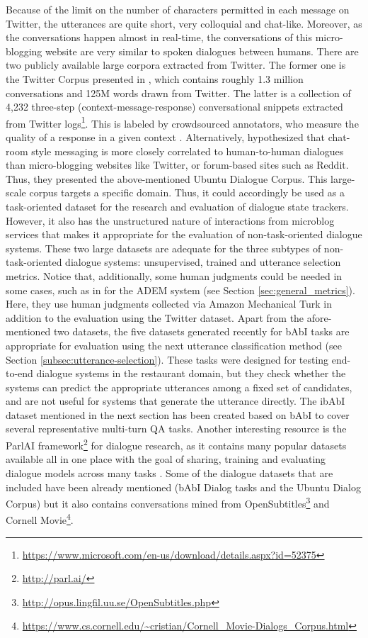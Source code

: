 Because of the limit on the number of characters permitted in each message on Twitter, the utterances are quite short, very colloquial and chat-like. Moreover, as the conversations happen almost in real-time, the conversations of this micro-blogging website are very similar to spoken dialogues between humans. There are two publicly available large corpora extracted from Twitter. The former one is the Twitter Corpus presented in , which contains roughly 1.3 million conversations and 125M words drawn from Twitter. The latter is a collection of 4,232 three-step (context-message-response) conversational snippets extracted from Twitter logs\footnote{\url{https://www.microsoft.com/en-us/download/details.aspx?id=52375}}. This is labeled by crowdsourced annotators, who measure the quality of a response in a given context .
Alternatively,  hypothesized that chat-room style messaging is more closely correlated to human-to-human dialogues than micro-blogging websites like Twitter, or forum-based sites such as Reddit. Thus, they presented the above-mentioned Ubuntu Dialogue Corpus. This large-scale corpus targets a specific domain. Thus, it could accordingly be used as a task-oriented dataset for the research and evaluation of dialogue state trackers. However, it also has the unstructured nature of interactions from microblog services that makes it appropriate for the evaluation of non-task-oriented dialogue systems. 
These two large datasets are adequate for the three subtypes of non-task-oriented dialogue systems: unsupervised, trained and utterance selection metrics. Notice that, additionally, some human judgments could be needed in some cases, such as in  for the ADEM system (see Section \ref{sec:general_metrics}). Here, they use human judgments collected via Amazon Mechanical Turk in addition to the evaluation using the Twitter dataset. 
Apart from the afore-mentioned two datasets, the five datasets generated recently for bAbI tasks  are appropriate for evaluation using the next utterance classification method (see Section \ref{subsec:utterance-selection}). These tasks were designed for testing end-to-end dialogue systems in the restaurant domain, but they check whether the systems can predict the appropriate utterances among a fixed set of candidates, and are not useful for systems that generate the utterance directly. The ibAbI dataset mentioned in the next section has been created based on bAbI to cover several representative multi-turn QA tasks.
Another interesting resource is the ParlAI framework\footnote{\url{http://parl.ai/}} for dialogue research, as it contains many popular datasets available all in one place with the goal of sharing, training and evaluating dialogue models across many tasks . Some of the dialogue datasets that are included have been already mentioned (bAbI Dialog tasks and the Ubuntu Dialog Corpus) but it also contains conversations mined from OpenSubtitles\footnote{\url{http://opus.lingfil.uu.se/OpenSubtitles.php}} and Cornell Movie\footnote{\url{https://www.cs.cornell.edu/~cristian/Cornell_Movie-Dialogs_Corpus.html}}.

